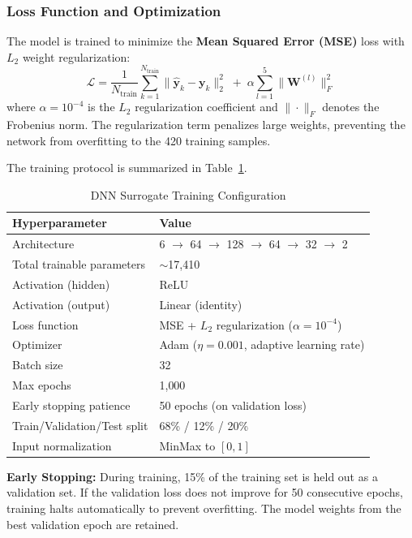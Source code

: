 \documentclass[12pt, a4paper]{report}
\begin{document}
\subsubsection{Loss Function and Optimization}
The model is trained to minimize the \textbf{Mean Squared Error (MSE)} loss with $L_2$ weight regularization:
\begin{equation}
    \mathcal{L} = \frac{1}{N_{\text{train}}} \sum_{k=1}^{N_{\text{train}}} \| \hat{\mathbf{y}}_k - \mathbf{y}_k \|_2^2 \;+\; \alpha \sum_{l=1}^{5} \| \mathbf{W}^{(l)} \|_F^2
    \label{eq:loss}
\end{equation}
where $\alpha = 10^{-4}$ is the $L_2$ regularization coefficient and $\| \cdot \|_F$ denotes the Frobenius norm. The regularization term penalizes large weights, preventing the network from overfitting to the 420 training samples.

\noindent The training protocol is summarized in Table~\ref{tab:dnn_config}.

\begin{table}[H]
\centering
\caption{DNN Surrogate Training Configuration}
\label{tab:dnn_config}
\begin{tabular}{@{}ll@{}}
\toprule
\textbf{Hyperparameter} & \textbf{Value} \\ \midrule
Architecture & 6 $\to$ 64 $\to$ 128 $\to$ 64 $\to$ 32 $\to$ 2 \\
Total trainable parameters & $\sim$17{,}410 \\
Activation (hidden) & ReLU \\
Activation (output) & Linear (identity) \\
Loss function & MSE + $L_2$ regularization ($\alpha = 10^{-4}$) \\
Optimizer & Adam ($\eta = 0.001$, adaptive learning rate) \\
Batch size & 32 \\
Max epochs & 1{,}000 \\
Early stopping patience & 50 epochs (on validation loss) \\
Train/Validation/Test split & 68\% / 12\% / 20\% \\
Input normalization & MinMax to $[0, 1]$ \\
\bottomrule
\end{tabular}
\end{table}

\noindent \textbf{Early Stopping:} During training, 15\% of the training set is held out as a validation set. If the validation loss does not improve for 50 consecutive epochs, training halts automatically to prevent overfitting. The model weights from the best validation epoch are retained.
\end{document}
